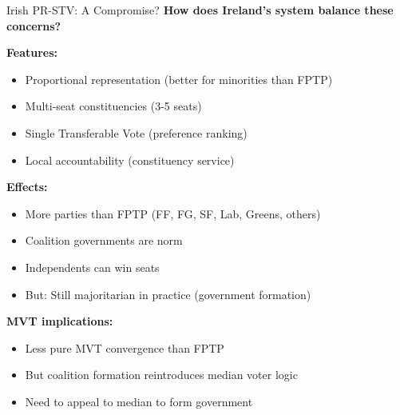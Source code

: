 \documentclass[10pt]{beamer}
\begin{document}
\begin{frame}[allowframebreaks]{Irish PR-STV: A Compromise?}
\textbf{How does Ireland's system balance these concerns?}



\textbf{Features:}
\begin{itemize}
\item Proportional representation (better for minorities than FPTP)
\item Multi-seat constituencies (3-5 seats)
\item Single Transferable Vote (preference ranking)
\item Local accountability (constituency service)
\end{itemize}



\textbf{Effects:}
\begin{itemize}
\item More parties than FPTP (FF, FG, SF, Lab, Greens, others)
\item Coalition governments are norm
\item Independents can win seats
\item \alert{But:} Still majoritarian in practice (government formation)
\end{itemize}


 \framebreak   
\textbf{MVT implications:}
\begin{itemize}
\item Less pure MVT convergence than FPTP
\item But coalition formation reintroduces median voter logic
\item Need to appeal to median to form government
\end{itemize}
\end{frame}
\end{document}
